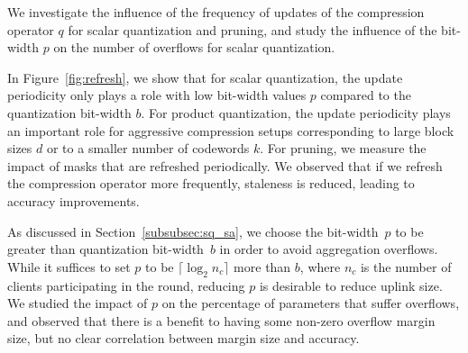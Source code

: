 We investigate the influence of the frequency of updates of the compression operator $q$ for scalar quantization and pruning, and study the influence of the \SecAgg bit-width $p$ on the number of overflows for scalar quantization.

 In Figure~\ref{fig:refresh}, we show that for scalar quantization, the update periodicity only plays a role with low \SecAgg bit-width values $p$ compared to the quantization bit-width $b$. For product quantization, the update periodicity plays an important role for aggressive compression setups corresponding to large block sizes $d$ or to a smaller number of codewords $k$. For pruning, we measure the impact of masks that are refreshed periodically. 
We observed that if we refresh the compression operator more frequently, staleness is reduced, leading to accuracy improvements. 

As discussed in Section~\ref{subsubsec:sq_sa}, we choose the \SecAgg bit-width~$p$ to be greater than quantization bit-width~$b$ in order to avoid aggregation overflows. While it suffices to set $p$ to be $\lceil\log_2 n_c\rceil$ more than $b$, where $n_c$ is the number of clients participating in the round, reducing $p$ is desirable to reduce uplink size. 
We studied the impact of  $p$ on the percentage of parameters that suffer overflows, and 
observed that there is a benefit to having some non-zero overflow margin size, but no clear correlation between margin size and accuracy. 


